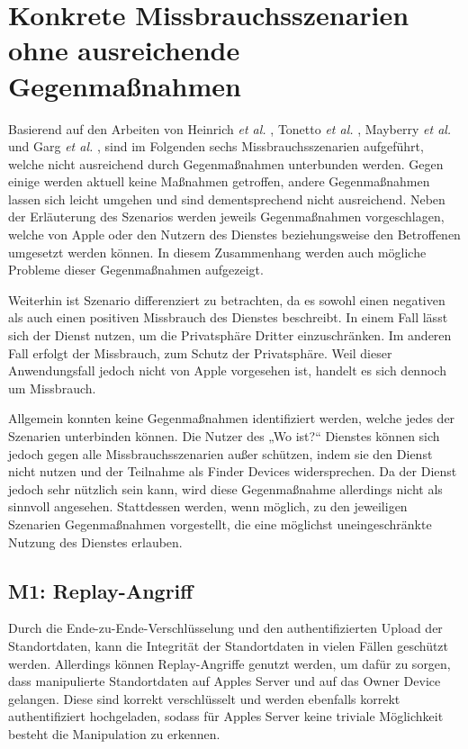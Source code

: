 
\section{Konkrete Missbrauchsszenarien ohne ausreichende Gegenmaßnahmen}
\label{sec:szenarien}

Basierend auf den Arbeiten von Heinrich \textit{et al.} \cite{Heinrich_FindMy}, Tonetto \textit{et al.} \cite{Tonetto_FindMy}, Mayberry \textit{et al.} \cite{Mayberry_Tracking} und Garg \textit{et al.} \cite{Garg_Secure_Tracker}, sind im Folgenden sechs Missbrauchsszenarien aufgeführt, welche nicht ausreichend durch Gegenmaßnahmen unterbunden werden.
Gegen einige werden aktuell keine Maßnahmen getroffen, andere Gegenmaßnahmen lassen sich leicht umgehen und sind dementsprechend nicht ausreichend.
Neben der Erläuterung des Szenarios werden jeweils Gegenmaßnahmen vorgeschlagen, welche von Apple oder den Nutzern des Dienstes beziehungsweise den Betroffenen umgesetzt werden können.
In diesem Zusammenhang werden auch mögliche Probleme dieser Gegenmaßnahmen aufgezeigt.

Weiterhin ist Szenario  differenziert zu betrachten, da es sowohl einen negativen als auch einen positiven Missbrauch des Dienstes beschreibt.
In einem Fall lässt sich der Dienst nutzen, um die Privatsphäre Dritter einzuschränken.
Im anderen Fall erfolgt der Missbrauch, zum Schutz der Privatsphäre.
Weil dieser Anwendungsfall jedoch nicht von Apple vorgesehen ist, handelt es sich dennoch um Missbrauch.



Allgemein konnten keine Gegenmaßnahmen identifiziert werden, welche jedes der Szenarien unterbinden können.
Die Nutzer des „Wo ist?“ Dienstes können sich jedoch gegen alle Missbrauchsszenarien außer  schützen, indem sie den Dienst nicht nutzen und der Teilnahme als Finder Devices widersprechen.
Da der Dienst jedoch sehr nützlich sein kann, wird diese Gegenmaßnahme allerdings nicht als sinnvoll angesehen.
Stattdessen werden, wenn möglich, zu den jeweiligen Szenarien Gegenmaßnahmen vorgestellt, die eine möglichst uneingeschränkte Nutzung des Dienstes erlauben.


\subsection[M1]{M1: Replay-Angriff}
\label{missbrauch:1}
Durch die Ende-zu-Ende-Verschlüsselung und den authentifizierten Upload der Standortdaten, kann die Integrität der Standortdaten in vielen Fällen geschützt werden.
Allerdings können Replay-Angriffe genutzt werden, um dafür zu sorgen, dass manipulierte Standortdaten auf Apples Server und auf das Owner Device gelangen.
Diese sind korrekt verschlüsselt und werden ebenfalls korrekt authentifiziert hochgeladen, sodass für Apples Server keine triviale Möglichkeit besteht die Manipulation zu erkennen.

